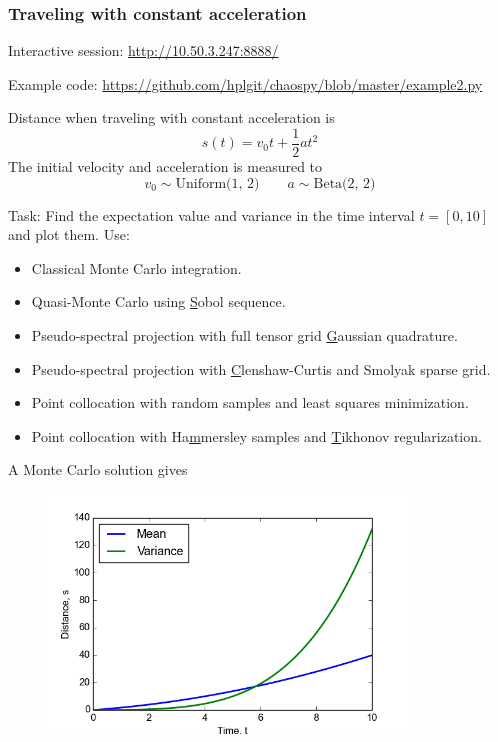 \documentclass{beamer}
\begin{document}
\begin{frame}
\frametitle{Traveling with constant acceleration}
\scriptsize
   \begin{alert}{Interactive session:}
\href{http://10.50.3.247:8888/}{http://10.50.3.247:8888/}
  \end{alert}
  
    \begin{alert}{Example code:}
\href{https://github.com/hplgit/chaospy/blob/master/example2.py}{https://github.com/hplgit/chaospy/blob/master/example2.py}\newline
  \end{alert}  
 


 Distance when traveling with constant acceleration is
 \[s(t) = v_0t + \frac{1}{2}at^2\]
\pause
The initial velocity and acceleration is measured to
\[v_0 \sim \text{Uniform(1, 2)} \qquad a \sim \text{Beta(2, 2)}\]
\pause
\begin{alert}{Task:}
Find the expectation value and variance in the time interval $t=[0,10]$  and plot them. Use:
\begin{itemize}
    \item Classical Monte Carlo integration.
    \item Quasi-Monte Carlo using \underline{S}obol sequence.
    \item Pseudo-spectral projection with full tensor grid \underline{G}aussian quadrature.
    \item Pseudo-spectral projection with \underline{C}lenshaw-Curtis and Smolyak sparse grid.
    \item Point collocation with random samples and least squares
        minimization.
    \item Point collocation with Ha\underline{m}mersley samples and \underline{T}ikhonov regularization.
\end{itemize}
\end{alert}
\end{frame}

\begin{frame}{A Monte Carlo solution gives}
 \begin{figure}
  \includegraphics[width=0.85\textwidth]{solution2.png}
 \end{figure}

\end{frame}
\end{document}
